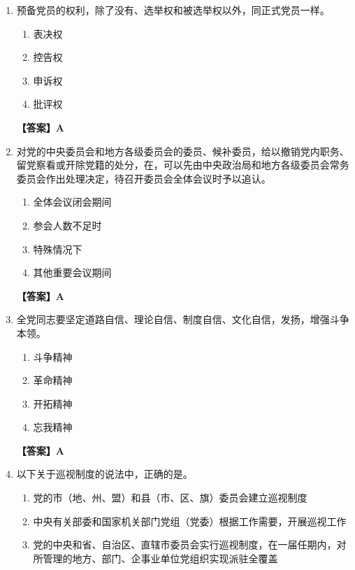 \documentclass[UTF8,11pt,a4paper]{ctexart}
\begin{document}
\begin{enumerate}[label=\textbf{\arabic*.}, leftmargin=2.5em, itemsep=0.7em]
\begin{enumerate}[label=\Alph*., leftmargin=2em, itemsep=0.1em, topsep=0.15em]
\item 党的地方各级代表大会
\end{enumerate}
\textbf{【答案】A}
\item 预备党员的权利，除了没有\allowbreak\underline{\hspace{4em}}、选举权和被选举权以外，同正式党员一样。
\begin{enumerate}[label=\Alph*., leftmargin=2em, itemsep=0.1em, topsep=0.15em]
\item 表决权
\item 控告权
\item 申诉权
\item 批评权
\end{enumerate}
\textbf{【答案】A}
\item 对党的中央委员会和地方各级委员会的委员、候补委员，给以撤销党内职务、留党察看或开除党籍的处分，在\allowbreak\underline{\hspace{4em}}，可以先由中央政治局和地方各级委员会常务委员会作出处理决定，待召开委员会全体会议时予以追认。
\begin{enumerate}[label=\Alph*., leftmargin=2em, itemsep=0.1em, topsep=0.15em]
\item 全体会议闭会期间
\item 参会人数不足时
\item 特殊情况下
\item 其他重要会议期间
\end{enumerate}
\textbf{【答案】A}
\item 全党同志要坚定道路自信、理论自信、制度自信、文化自信，发扬\allowbreak\underline{\hspace{4em}}，增强斗争本领。
\begin{enumerate}[label=\Alph*., leftmargin=2em, itemsep=0.1em, topsep=0.15em]
\item 斗争精神
\item 革命精神
\item 开拓精神
\item 忘我精神
\end{enumerate}
\textbf{【答案】A}
\item 以下关于巡视制度的说法中，正确的是\allowbreak\underline{\hspace{4em}}。
\begin{enumerate}[label=\Alph*., leftmargin=2em, itemsep=0.1em, topsep=0.15em]
\item 党的市（地、州、盟）和县（市、区、旗）委员会建立巡视制度
\item 中央有关部委和国家机关部门党组（党委）根据工作需要，开展巡视工作
\item 党的中央和省、自治区、直辖市委员会实行巡视制度，在一届任期内，对所管理的地方、部门、企事业单位党组织实现派驻全覆盖

\end{enumerate}
\end{enumerate}
\end{document}
